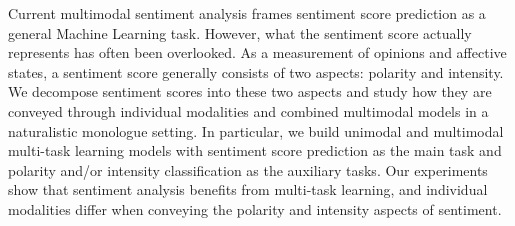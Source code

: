 Current multimodal sentiment analysis frames sentiment score prediction as a general Machine Learning task. However, what the sentiment score actually represents has often been overlooked. As a measurement of opinions and affective states, a sentiment score generally consists of two aspects: polarity and intensity. We decompose sentiment scores into these two aspects and study how they are conveyed through individual modalities and combined multimodal models in a naturalistic monologue setting. In particular, we build unimodal and multimodal multi-task learning models with sentiment score prediction as the main task and polarity and/or intensity classification as the auxiliary tasks. Our experiments show that sentiment analysis benefits from multi-task learning, and individual modalities differ when conveying the polarity and intensity aspects of sentiment.

